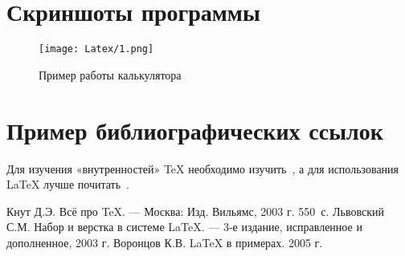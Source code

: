 \documentclass[12pt,a4paper]{scrartcl}
\begin{document}
\section{Скриншоты программы}
\label{sec:picexample}
\begin{figure}[h]
	\texttt{[image: Latex/1.png]}
	\caption{Пример работы калькулятора}\label{fig:par}
\end{figure}


\section{Пример библиографических ссылок}

Для изучения «внутренностей» \TeX{} необходимо 
изучить~\cite{Knuth-2003}, а для использования \LaTeX{} лучше
почитать~\cite{Lvovsky-2003, Voroncov-2005}.

\begin{thebibliography}{9}
Кнут Д.Э. Всё про \TeX. \newblock --- Москва: Изд. Вильямс, 2003 г. 550~с.
Львовский С.М. Набор и верстка в системе \LaTeX{}. \newblock --- 3-е издание, исправленное и дополненное, 2003 г.
Воронцов К.В. \LaTeX{} в примерах. 2005 г.
\end{thebibliography}
\end{document}
